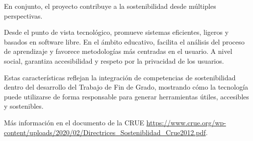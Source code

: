 En conjunto, el proyecto contribuye a la sostenibilidad desde múltiples perspectivas.

Desde el punto de vista tecnológico, promueve sistemas eficientes, ligeros y basados en software libre. En el ámbito educativo, facilita el análisis del proceso de aprendizaje y favorece metodologías más centradas en el usuario. A nivel social, garantiza accesibilidad y respeto por la privacidad de los usuarios.

Estas características reflejan la integración de competencias de sostenibilidad dentro del desarrollo del Trabajo de Fin de Grado, mostrando cómo la tecnología puede utilizarse de forma responsable para generar herramientas útiles, accesibles y sostenibles.

Más información en el documento de la CRUE \url{https://www.crue.org/wp-content/uploads/2020/02/Directrices_Sosteniblidad_Crue2012.pdf}.


